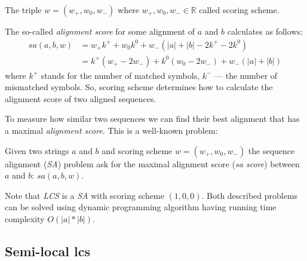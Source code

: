 \begin{definition}
The triple $w=(w_{+},w_{0},w_{-})$ where $w_{+},w_{0},w_{-} \in \mathbb{R} $ called scoring scheme.
\end{definition}

The so-called \emph{alignment score} for some alignment of $a$ and $b$ calculates as follows:
\begin{equation}\label{formula:sa}
\begin{array}{ll}
    sa(a,b,w) &= w_{+}k^{+} + w_{0}k^{0} + w_{-} (|a| + |b| - 2k^{+} - 2k^{0}) \\
    &= k^{+} (w_{+} - 2w_{-} ) + k^{0}  (w_{0} - 2w_{-}) + w_{-}(|a| + |b|)
\end{array}
\end{equation}
where $k^{+}$ stands for the number of matched symbols, $k^{-}$ --- the number of mismatched symbols.
So, scoring scheme determines how to calculate the alignment score of two aligned sequences.

To measure how similar two sequences we can find their best alignment that has a maximal \emph{ alignment score}.
This is a well-known problem:
\begin{definition}
Given two strings $a$ and $b$ and scoring scheme $w=(w_{+},w_{0},w_{-})$ the sequence alignment (\emph{SA}) problem ask for the maximal alignment score (\emph{sa score}) between $a$ and $b$: $sa(a,b,w)$.
\end{definition}



Note that \emph{LCS} is a \emph{SA} with scoring scheme $(1,0,0)$.
Both described problems can be solved using dynamic programming algorithm having running time complexity $O(|a|*|b|)$.

\subsection{Semi-local lcs}

